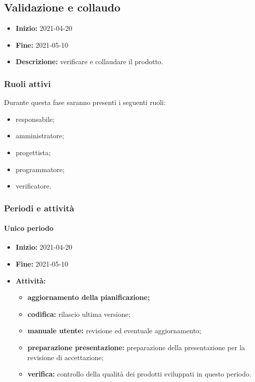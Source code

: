 
\subsection{Validazione e collaudo} \label{_pianificazioneValidazioneCollaudo}
\begin{itemize}
    \item [] \textbf{Inizio:} 2021-04-20
    \item [] \textbf{Fine:} 2021-05-10
    \item [] \textbf{Descrizione:} verificare e collaudare il prodotto.
\end{itemize}

\subsubsection{Ruoli attivi}
Durante questa fase saranno presenti i seguenti ruoli:
\begin{itemize}
    \item responsabile;
    \item amministratore;
    \item progettista;
    \item programmatore;
    \item verificatore.
\end{itemize}

\subsubsection{Periodi e attività}

\paragraph[Unico periodo]{Unico periodo}
\begin{itemize}
    \item [] \textbf{Inizio:} 2021-04-20
    \item [] \textbf{Fine:} 2021-05-10
    \item [] \textbf{Attività:}
          \begin{itemize}
              \item \textbf{aggiornamento della pianificazione;}
              \item \textbf{codifica:} rilascio ultima versione;
              \item \textbf{manuale utente:} revisione ed eventuale aggiornamento;
              \item \textbf{preparazione presentazione:} preparazione della presentazione per la revisione di accettazione;
              \item \textbf{verifica:} controllo della qualità dei prodotti sviluppati in questo periodo.
          \end{itemize}
\end{itemize}


